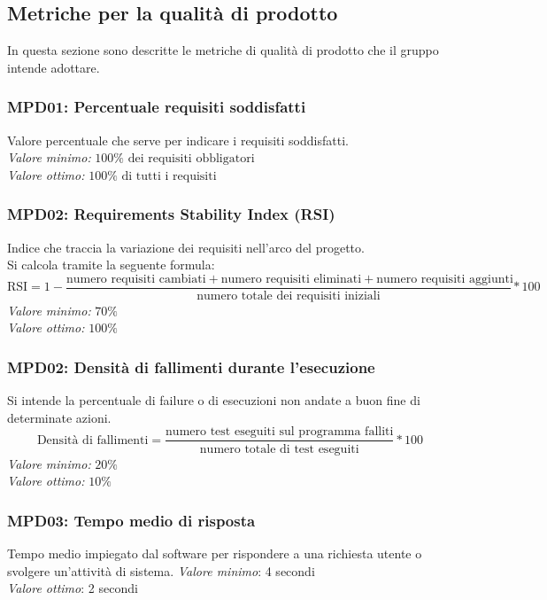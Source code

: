 \subsection{Metriche per la qualità di prodotto}
In questa sezione sono descritte le metriche di qualità di prodotto che il gruppo intende adottare.

\subsubsection{MPD01: Percentuale requisiti soddisfatti}
Valore percentuale che serve per indicare i requisiti soddisfatti.\\
\textit{Valore minimo:} $100\% \text{ dei requisiti obbligatori}$\\
\textit{Valore ottimo:} $100\% \text{ di tutti i requisiti}$
\subsubsection{MPD02: Requirements Stability Index (RSI)}
Indice che traccia la variazione dei requisiti nell'arco del progetto.\\
Si calcola tramite la seguente formula:
\begin{equation*}
\text{RSI}=1-\frac{\text{numero requisiti cambiati}+\text{numero requisiti eliminati}+\text{numero requisiti aggiunti}}{\text{numero totale dei requisiti iniziali}}*100
\end{equation*}
\textit{Valore minimo:} $70\%$\\
\textit{Valore ottimo:} $100\%$

\subsubsection{MPD02: Densità di fallimenti durante l'esecuzione}
Si intende la percentuale di failure o di esecuzioni non andate a buon fine di determinate azioni.
\begin{equation*}
\text{Densità di fallimenti}=\frac{\text{numero test eseguiti sul programma falliti}}{\text{numero totale di test eseguiti}}*100
\end{equation*}
\textit{Valore minimo:} $20\%$\\
\textit{Valore ottimo:} $10\%$

\subsubsection{MPD03: Tempo medio di risposta}
Tempo medio impiegato dal software per rispondere a una richiesta utente o svolgere un’attività di sistema.
\textit{Valore minimo}: 4 secondi\\
\textit{Valore ottimo}: 2 secondi\\


